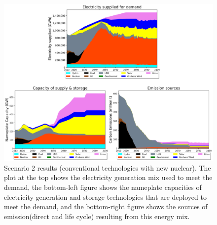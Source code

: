 \begin{figure}[H] 
\centering
\includegraphics[scale=0.5]{figures/conv_nuc}
\caption{Scenario 2 results (conventional technologies with new nuclear). The plot at the top shows the electricity generation mix used to meet the demand, the bottom-left figure shows the nameplate capacities of electricity generation and storage technologies that are deployed to meet the demand, and the bottom-right figure shows the sources of emission(direct and life cycle) resulting from this energy mix.}
\label{scen2}
\end{figure}

